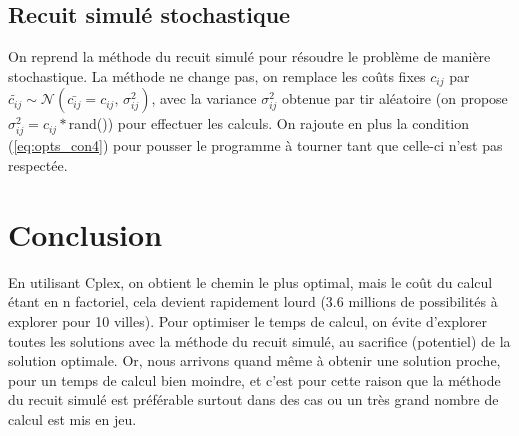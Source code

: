 \documentclass{article}
\begin{document}
\subsection{Recuit simulé stochastique}
On reprend la méthode du recuit simulé pour résoudre le problème de manière stochastique. La méthode ne change pas, on remplace les coûts fixes \(c_{ij}\) par \(\tilde{c_{ij}} \sim \mathcal{N}(\bar{c_{ij}} = c_{ij},\,\sigma_{ij}^{2}) \), avec la variance \(\sigma_{ij}^{2}\) obtenue par tir aléatoire (on propose \(\sigma_{ij}^{2}=c_{ij}*\)rand()) pour effectuer les calculs. On rajoute en plus la condition (\ref{eq:opts_con4}) pour pousser le programme à tourner tant que celle-ci n’est pas respectée.
\section{Conclusion}
En utilisant Cplex, on obtient le chemin le plus optimal, mais le coût du calcul étant en n factoriel, cela devient rapidement lourd (3.6 millions de possibilités à explorer pour 10 villes). Pour optimiser le temps de calcul, on évite d’explorer toutes les solutions avec la méthode du recuit simulé, au sacrifice (potentiel) de la solution optimale. Or, nous arrivons quand même à obtenir une solution proche, pour un temps de calcul bien moindre, et c'est pour cette raison que la méthode du recuit simulé est préférable surtout dans des cas ou un très grand nombre de calcul est mis en jeu.
\end{document}

